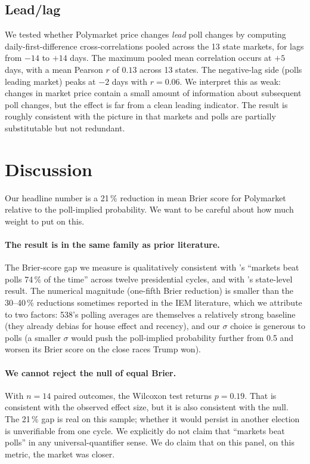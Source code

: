 \documentclass{article}
\begin{document}
\subsection{Lead/lag}

We tested whether Polymarket price changes \emph{lead} poll changes by
computing daily-first-difference cross-correlations pooled across the 13
state markets, for lags from $-14$ to $+14$ days. The maximum pooled mean
correlation occurs at $+5$ days, with a mean Pearson $r$ of $0.13$ across
13 states. The negative-lag side (polls leading market) peaks at $-2$
days with $r = 0.06$. We interpret this as weak: changes in market price
contain a small amount of information about subsequent poll changes, but
the effect is far from a clean leading indicator. The result is roughly
consistent with the picture in \citet{snowberg2013prediction} that
markets and polls are partially substitutable but not redundant.

\section{Discussion}
\label{sec:discussion}

Our headline number is a 21\,\% reduction in mean Brier score for
Polymarket relative to the poll-implied probability. We want to be
careful about how much weight to put on this.

\paragraph{The result is in the same family as prior literature.}
The Brier-score gap we measure is qualitatively consistent with
\citet{berg2008results}'s ``markets beat polls 74\,\% of the time'' across
twelve presidential cycles, and with \citet{rothschild2009forecasting}'s
state-level result. The numerical magnitude (one-fifth Brier reduction)
is smaller than the 30--40\,\% reductions sometimes reported in the IEM
literature, which we attribute to two factors: 538's polling averages are
themselves a relatively strong baseline (they already debias for house
effect and recency), and our $\sigma$ choice is generous to polls (a
smaller $\sigma$ would push the poll-implied probability further from 0.5
and worsen its Brier score on the close races Trump won).

\paragraph{We cannot reject the null of equal Brier.}
With $n = 14$ paired outcomes, the Wilcoxon test returns $p = 0.19$.
That is consistent with the observed effect size, but it is also
consistent with the null. The 21\,\% gap is real on this sample; whether
it would persist in another election is unverifiable from one cycle. We
explicitly do not claim that ``markets beat polls'' in any
universal-quantifier sense. We do claim that on this panel, on this
metric, the market was closer.
\end{document}
